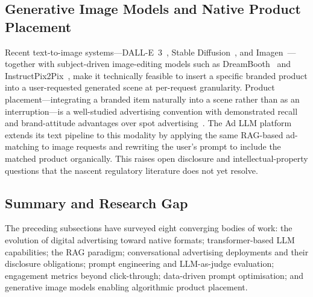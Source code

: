 \subsection{Generative Image Models and Native Product Placement}
\label{subsec:image-placement}

Recent text-to-image systems---DALL-E~3~\cite{betker2023dalle3}, Stable Diffusion~\cite{rombach2022ldm}, and Imagen~\cite{saharia2022imagen}---together with subject-driven image-editing models such as DreamBooth~\cite{ruiz2023dreambooth} and InstructPix2Pix~\cite{brooks2023instructpix2pix}, make it technically feasible to insert a specific branded product into a user-requested generated scene at per-request granularity. Product placement---integrating a branded item naturally into a scene rather than as an interruption---is a well-studied advertising convention with demonstrated recall and brand-attitude advantages over spot advertising~\cite{balasubramanian2006productplacement, vanreijmersdal2009placement}. The Ad LLM platform extends its text pipeline to this modality by applying the same RAG-based ad-matching to image requests and rewriting the user's prompt to include the matched product organically. This raises open disclosure and intellectual-property questions that the nascent regulatory literature does not yet resolve.

\subsection{Summary and Research Gap}
\label{subsec:lit-summary}

The preceding subsections have surveyed eight converging bodies of work: the evolution of digital advertising toward native formats; transformer-based LLM capabilities; the RAG paradigm; conversational advertising deployments and their disclosure obligations; prompt engineering and LLM-as-judge evaluation; engagement metrics beyond click-through; data-driven prompt optimisation; and generative image models enabling algorithmic product placement.

